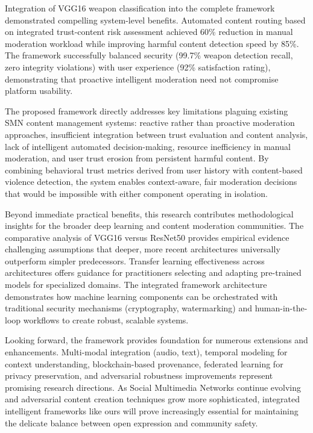 \documentclass[conference]{IEEEtran}
\begin{document}
Integration of VGG16 weapon classification into the complete framework demonstrated compelling system-level benefits. Automated content routing based on integrated trust-content risk assessment achieved 60\% reduction in manual moderation workload while improving harmful content detection speed by 85\%. The framework successfully balanced security (99.7\% weapon detection recall, zero integrity violations) with user experience (92\% satisfaction rating), demonstrating that proactive intelligent moderation need not compromise platform usability.

The proposed framework directly addresses key limitations plaguing existing SMN content management systems: reactive rather than proactive moderation approaches, insufficient integration between trust evaluation and content analysis, lack of intelligent automated decision-making, resource inefficiency in manual moderation, and user trust erosion from persistent harmful content. By combining behavioral trust metrics derived from user history with content-based violence detection, the system enables context-aware, fair moderation decisions that would be impossible with either component operating in isolation.

Beyond immediate practical benefits, this research contributes methodological insights for the broader deep learning and content moderation communities. The comparative analysis of VGG16 versus ResNet50 provides empirical evidence challenging assumptions that deeper, more recent architectures universally outperform simpler predecessors. Transfer learning effectiveness across architectures offers guidance for practitioners selecting and adapting pre-trained models for specialized domains. The integrated framework architecture demonstrates how machine learning components can be orchestrated with traditional security mechanisms (cryptography, watermarking) and human-in-the-loop workflows to create robust, scalable systems.

Looking forward, the framework provides foundation for numerous extensions and enhancements. Multi-modal integration (audio, text), temporal modeling for context understanding, blockchain-based provenance, federated learning for privacy preservation, and adversarial robustness improvements represent promising research directions. As Social Multimedia Networks continue evolving and adversarial content creation techniques grow more sophisticated, integrated intelligent frameworks like ours will prove increasingly essential for maintaining the delicate balance between open expression and community safety.
\end{document}
